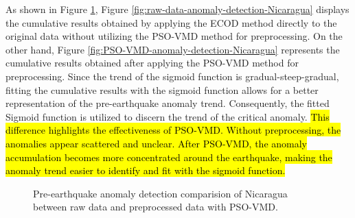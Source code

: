 \documentclass[3p,authoryear,preprint,12pt]{elsarticle}
\begin{document}
As shown in Figure \ref{fig:pre-earthquake-anomaly-detection-Nicaragua}, Figure \ref{fig:raw-data-anomaly-detection-Nicaragua} displays the cumulative results obtained by applying the ECOD method directly to {the original data} without utilizing the PSO-VMD method for preprocessing. On the other hand, Figure \ref{fig:PSO-VMD-anomaly-detection-Nicaragua} represents the cumulative results obtained after applying the PSO-VMD method for preprocessing. Since the trend of the {sigmoid function}\citep{oksumNovelApproachBased2021} is gradual-steep-gradual, fitting the cumulative results with the sigmoid function allows for a better representation of the pre-earthquake anomaly trend. Consequently, the fitted Sigmoid function is utilized to discern the trend of the critical anomaly. \hl{This difference highlights the effectiveness of PSO-VMD. Without preprocessing, the anomalies appear scattered and unclear. After PSO-VMD, the anomaly accumulation becomes more concentrated around the earthquake, making the anomaly trend easier to identify and fit with the sigmoid function.}
\begin{figure}[htbp]
	\centering
	\caption{{Pre-earthquake anomaly detection comparision of Nicaragua between raw data and preprocessed data with PSO-VMD.}}
	\label{fig:pre-earthquake-anomaly-detection-Nicaragua}
\end{figure}
\end{document}

